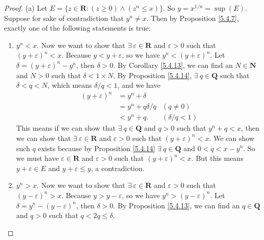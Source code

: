 \begin{proof}{(a)}
    Let \(E = \{z \in \mathbf{R} : (z \geq 0) \land (z^n \leq x)\}\).
    So \(y = x^{1 / n} = \sup(E)\).
    Suppose for sake of contradiction that \(y^n \neq x\).
    Then by Proposition \ref{5.4.7}, exactly one of the following statements is true:
    \begin{enumerate}[label=(\Roman*)]
        \item \(y^n < x\).
              Now we want to show that \(\exists\ \varepsilon \in \mathbf{R}\) and \(\varepsilon > 0\) such that \((y + \varepsilon)^n < x\).
              Because \(y < y + \varepsilon\), so we have \(y^n < (y + \varepsilon)^n\).
              Let \(\delta = (y + \varepsilon)^n - y^n\), then \(\delta > 0\).
              By Corollary \ref{5.4.13}, we can find an \(N \in \mathbf{N}\) and \(N > 0\) such that \(\delta < 1 \times N\).
              By Proposition \ref{5.4.14}, \(\exists\ q \in \mathbf{Q}\) such that \(\delta < q < N\), which means \(\delta / q < 1\), and we have
              \begin{align*}
                  (y + \varepsilon)^n & = y^n + \delta                          \\
                                      & = y^n + q \delta / q & (q \neq 0)       \\
                                      & < y^n + q.           & (\delta / q < 1)
              \end{align*}
              This means if we can show that \(\exists\ q \in \mathbf{Q}\) and \(q > 0\) such that \(y^n + q < x\), then we can show that \(\exists\ \varepsilon \in \mathbf{R}\) and \(\varepsilon > 0\) such that \((y + \varepsilon)^n < x\).
              We can show such \(q\) exists because by Proposition \ref{5.4.14} \(\exists\ q \in \mathbf{Q}\) and \(0 < q < x - y^n\).
              So we must have \(\varepsilon \in \mathbf{R}\) and \(\varepsilon > 0\) such that \((y + \varepsilon)^n < x\).
              But this means \(y + \varepsilon \in E\) and \(y + \varepsilon \leq y\), a contradiction.
        \item \(y^n > x\).
              Now we want to show that \(\exists\ \varepsilon \in \mathbf{R}\) and \(\varepsilon > 0\) such that \((y - \varepsilon)^n > x\).
              Because \(y > y - \varepsilon\), so we have \(y^n > (y - \varepsilon)^n\).
              Let \(\delta = y^n - (y - \varepsilon)^n\), then \(\delta > 0\).
              By Proposition \ref{5.4.13}, we can find an \(q \in \mathbf{Q}\) and \(q > 0\) such that \(q < 2q \leq \delta\).

\end{enumerate}
\end{proof}
